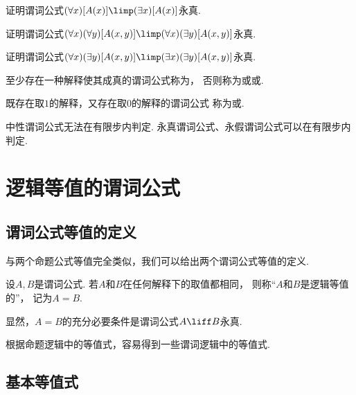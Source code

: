 \begin{example}
证明谓词公式\(
	(\forall x)
	[A(x)]
	\limp
	(\exists x)
	[A(x)]
\)永真.
\end{example}

\begin{example}
证明谓词公式\(
	(\forall x)
	(\forall y)
	[A(x,y)]
	\limp
	(\forall x)
	(\exists y)
	[A(x,y)]
\)永真.
\end{example}

\begin{example}
证明谓词公式\(
	(\forall x)
	(\exists y)
	[A(x,y)]
	\limp
	(\exists x)
	(\exists y)
	[A(x,y)]
\)永真.
\end{example}

至少存在一种解释使其成真的谓词公式称为，
否则称为或或.

既存在取\(1\)的解释，又存在取\(0\)的解释的谓词公式
称为或.

\begin{theorem}
中性谓词公式无法在有限步内判定.
永真谓词公式、永假谓词公式可以在有限步内判定.
\end{theorem}

\section{逻辑等值的谓词公式}
\subsection{谓词公式等值的定义}
与两个命题公式等值完全类似，我们可以给出两个谓词公式等值的定义.
\begin{definition}
设\(A,B\)是谓词公式.
若\(A\)和\(B\)在任何解释下的取值都相同，
则称“\(A\)和\(B\)是逻辑等值的”，
记为\(A=B\).
\end{definition}

显然，\(A=B\)的充分必要条件是谓词公式\(A \liff B\)永真.

根据命题逻辑中的等值式，容易得到一些谓词逻辑中的等值式.

\subsection{基本等值式}
